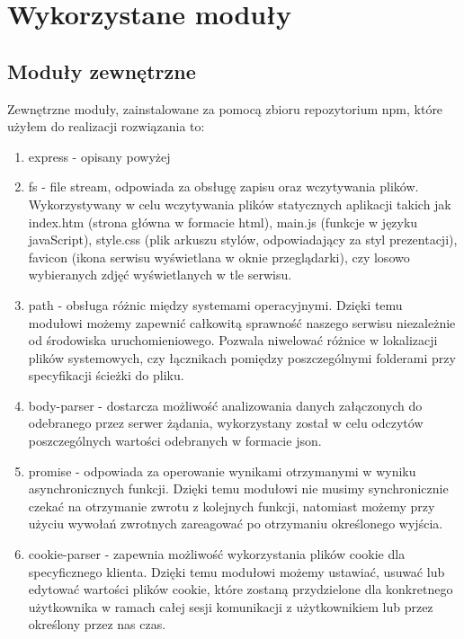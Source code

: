 \documentclass[12pt]{report}
\begin{document}
\section{Wykorzystane moduły}

\subsection{Moduły zewnętrzne}
Zewnętrzne moduły, zainstalowane za pomocą zbioru repozytorium npm, które użyłem do realizacji rozwiązania to:
\begin{enumerate}
\item express - opisany powyżej
\item fs - file stream, odpowiada za obsługę zapisu oraz wczytywania plików. 
Wykorzystywany w celu wczytywania plików statycznych aplikacji takich jak index.htm (strona główna w formacie html), main.js (funkcje w języku javaScript), style.css (plik arkuszu stylów, odpowiadający za styl prezentacji), favicon (ikona serwisu wyświetlana w oknie przeglądarki), czy losowo wybieranych zdjęć wyświetlanych w tle serwisu.
\item path - obsługa różnic między systemami operacyjnymi. 
Dzięki temu modułowi możemy zapewnić całkowitą sprawność naszego serwisu niezależnie od środowiska uruchomieniowego. 
Pozwala niwelować różnice w lokalizacji plików systemowych, czy łącznikach pomiędzy poszczególnymi folderami przy specyfikacji ścieżki do pliku.
\item body-parser - dostarcza możliwość analizowania danych załączonych do odebranego przez serwer żądania, wykorzystany został w celu odczytów poszczególnych wartości odebranych w formacie json.
\item promise - odpowiada za operowanie wynikami otrzymanymi w wyniku asynchronicznych funkcji. 
Dzięki temu modułowi nie musimy synchronicznie czekać na otrzymanie zwrotu z kolejnych funkcji, natomiast możemy przy użyciu wywołań zwrotnych zareagować po otrzymaniu określonego wyjścia.
\item cookie-parser - zapewnia możliwość wykorzystania plików cookie dla specyficznego klienta. 
Dzięki temu modułowi możemy ustawiać, usuwać lub edytować wartości plików cookie, które zostaną przydzielone dla konkretnego użytkownika w ramach całej sesji komunikacji z użytkownikiem lub przez określony przez nas czas. 
\end{enumerate}
\end{document}
